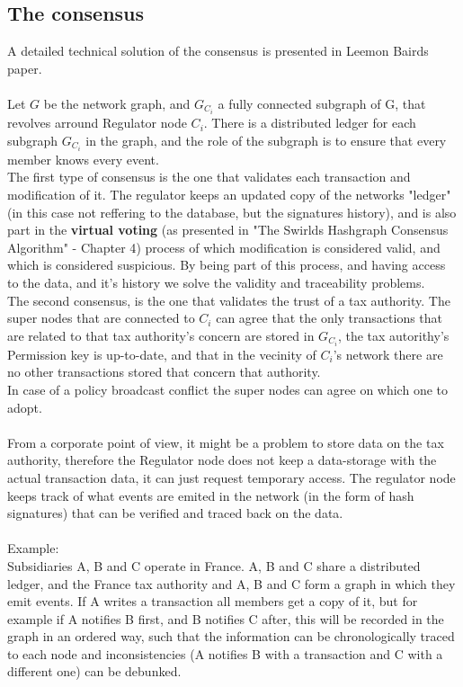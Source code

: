 \subsection{The consensus}
A detailed technical solution of the consensus is presented in Leemon Bairds paper\cite{hashgraph}.\\
\\
Let $G$ be the network graph, and $G_{C_i}$ a fully connected subgraph of G, that revolves arround Regulator node $C_i$. There is a distributed ledger for each subgraph $G_{C_i}$ in the graph, and the role of the subgraph is to ensure that every member knows every event.\\
The first type of consensus is the one that validates each transaction and modification of it. The regulator keeps an updated copy of the networks "ledger" (in this case not reffering to the database, but the signatures history), and is also part in the \textbf{virtual voting} (as presented in "The Swirlds Hashgraph Consensus Algorithm" - Chapter 4\cite{hashgraph}) process of which modification is considered valid, and which is considered suspicious. By being part of this process, and having access to the data, and it's history we solve the validity and traceability problems.\\
The second consensus, is the one that validates the trust of a tax authority. The super nodes that are connected to $C_i$ can agree that the only transactions that are related to that tax authority's concern are stored in $G_{C_i}$, the tax autorithy's Permission key is up-to-date, and that in the vecinity of $C_i$'s network there are no other transactions stored that concern that authority.\\
In case of a policy broadcast conflict the super nodes can agree on which one to adopt. \\
\\
From a corporate point of view, it might be a problem to store data on the tax authority, therefore the Regulator node does not keep a data-storage with the actual transaction data, it can just request temporary access. The regulator node keeps track of what events are emited in the network (in the form of hash signatures) that can be verified and traced back on the data.\\
\\
Example:\\
Subsidiaries A, B and C operate in France. A, B and C share a distributed ledger, and the France tax authority and A, B and C form a graph in which they emit events. If A writes a transaction all members get a copy of it, but for example if A notifies B first, and B notifies C after, this will be recorded in the graph in an ordered way, such that the information can be chronologically traced to each node and inconsistencies (A notifies B with a transaction and C with a different one) can be debunked.


